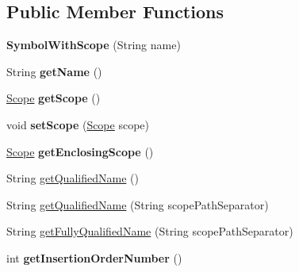 \subsection*{Public Member Functions}
\begin{DoxyCompactItemize}
\item 
\mbox{\label{classlime_1_1antlr4_1_1SymbolWithScope_a3c505ddb292cf2d4166938e06f96c427}} 
{\bfseries Symbol\+With\+Scope} (String name)
\item 
\mbox{\label{classlime_1_1antlr4_1_1SymbolWithScope_aac22203297178d4b686062f3ed080f2a}} 
String {\bfseries get\+Name} ()
\item 
\mbox{\label{classlime_1_1antlr4_1_1SymbolWithScope_a53bfb3b22d84aa9bd870665af4b6c90c}} 
\hyperlink{interfacelime_1_1antlr4_1_1Scope}{Scope} {\bfseries get\+Scope} ()
\item 
\mbox{\label{classlime_1_1antlr4_1_1SymbolWithScope_a6a08ad294932ce212aa339bd3ce4b997}} 
void {\bfseries set\+Scope} (\hyperlink{interfacelime_1_1antlr4_1_1Scope}{Scope} scope)
\item 
\mbox{\label{classlime_1_1antlr4_1_1SymbolWithScope_a4488146ee888a010983dfccf8b368b20}} 
\hyperlink{interfacelime_1_1antlr4_1_1Scope}{Scope} {\bfseries get\+Enclosing\+Scope} ()
\item 
String \hyperlink{classlime_1_1antlr4_1_1SymbolWithScope_a84495a0d09bc077969de2108fab615c1}{get\+Qualified\+Name} ()
\item 
String \hyperlink{classlime_1_1antlr4_1_1SymbolWithScope_a65ee148391eeb9a5784bf2c2eccb54d3}{get\+Qualified\+Name} (String scope\+Path\+Separator)
\item 
String \hyperlink{classlime_1_1antlr4_1_1SymbolWithScope_a68929d57f3b42ada5948bec1e5fef6e3}{get\+Fully\+Qualified\+Name} (String scope\+Path\+Separator)
\item 
\mbox{\label{classlime_1_1antlr4_1_1SymbolWithScope_acf40670499a6511243ea7e3766098eaa}} 
int {\bfseries get\+Insertion\+Order\+Number} ()
\item 
\mbox{\label{classlime_1_1antlr4_1_1SymbolWithScope_a542ef94191c417446101105cf488912b}} 

\end{DoxyCompactItemize}
